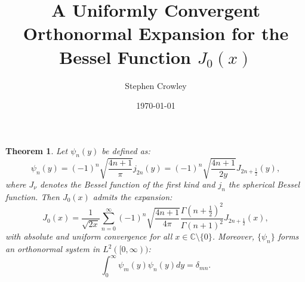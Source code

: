 \documentclass{article}
\title{A Uniformly Convergent Orthonormal Expansion for the Bessel Function $J_0(x)$}
\author{Stephen Crowley}
\date{\today}
\newtheorem{theorem}{Theorem}
\begin{document}
\maketitle

\begin{theorem}\label{thm:main}
Let $\psi_n(y)$ be defined as:
\begin{equation}
\psi_n(y) = (-1)^n \sqrt{\frac{4n+1}{\pi}} j_{2n}(y) = (-1)^n \sqrt{\frac{4n+1}{2y}} J_{2n+\frac{1}{2}}(y),
\end{equation}
where $J_\nu$ denotes the Bessel function of the first kind and $j_n$ the spherical Bessel function. Then $J_0(x)$ admits the expansion:
\begin{equation}
J_0(x) = \frac{1}{\sqrt{2x}} \sum_{n=0}^\infty (-1)^n \sqrt{\frac{4n+1}{4\pi}} \frac{\Gamma\left(n+\frac{1}{2}\right)^2}{\Gamma(n+1)^2} J_{2n+\frac{1}{2}}(x),
\end{equation}
with absolute and uniform convergence for all $x \in \mathbb{C} \setminus \{0\}$. Moreover, $\{\psi_n\}$ forms an orthonormal system in $L^2([0,\infty))$:
\begin{equation}
\int_0^\infty \psi_m(y)\psi_n(y) dy = \delta_{mn}.
\end{equation}
\end{theorem}
\end{document}
